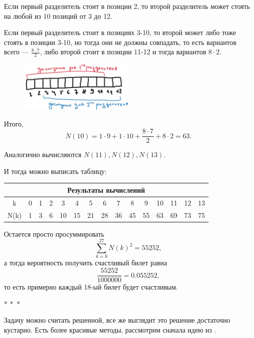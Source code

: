 \documentclass[a4paper,12pt]{article}
\newcommand{\threestars}{\begin{center}$ {\ast}\,{\ast}\,{\ast} $\end{center}}
\newcounter{th-counter}
\newcounter{col-counter}
\begin{document}
Если первый разделитель стоит в позиции 2, то второй разделитель может стоять на любой из 10 позиций от 3 до 12.

Если первый разделитель стоит в позициях 3-10, то второй может либо тоже стоять в позиции 3-10, но тогда они не должны совпадать, то есть вариантов всего --- $\frac{8 \cdot 7}{2}$, либо второй стоит в позиции 11-12 и тогда вариантов $8 \cdot 2$.

\begin{figure}[h] %
    \centering
    \includegraphics[width=0.5\textwidth]{pictures/HappyTicketsFor10.jpg}
\end{figure}

Итого,
\[
N(10) = 1 \cdot 9 + 1 \cdot 10 + \frac{8 \cdot 7}{2} + 8 \cdot 2 = 63.
\]

Аналогично вычисляются $N(11), N(12), N(13)$.

И тогда можно выписать таблицу:\\

\begin{center}
    \begin{tabular}{|*{15}{c|}} %
    \hline
    \multicolumn{15}{|c|}{\textbf{Результаты вычислений}} \\
    \hline
    k & 0 & 1 & 2 & 3 & 4 & 5 & 6 & 7 & 8 & 9 & 10 &
    11 & 12 & 13 \\
    \hline
    N(k) & 1 & 3 & 6 & 10 & 15 & 21 & 28 & 36 & 45 &
    55 & 63 & 69 & 73 & 75\\
    \hline
    \end{tabular}
\end{center}

Остается просто просуммировать
\[
\sum_{k=0}^{27} N(k)^2 = 55252,
\]
а тогда вероятность получить счастливый билет равна
\[
\frac{55252}{1000000} = 0.055252,
\]
то есть примерно каждый 18-ый билет будет счастливым.

\threestars

Задачу можно считать решенной, все же выглядит это решение достаточно кустарно. Есть более красивые методы, рассмотрим сначала идею из \cite{OneMoreTimeAboutHappyTickets}.



\newpage
\nocite{*}
\printbibliography[nottype=unpublished]
\end{document}
